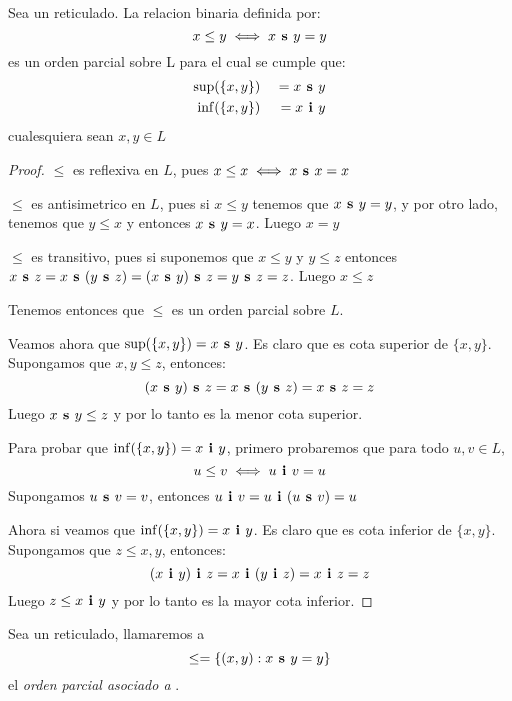 \begin{theorem}
  Sea \reticulAlg un reticulado. La relacion binaria definida por:
  $$
  x \leq y \iff x\textbf{ s }y = y
  $$
  es un orden parcial sobre L para el cual se cumple que:
  \begin{alignat*}{2}
    \sup&(\{x, y\}) &\ = x\textbf{ s }y\\
    \inf&(\{x, y\}) &\ = x\textbf{ i }y
  \end{alignat*}
  cualesquiera sean $x, y \in L$
\end{theorem}
\begin{proof}
  $\leq$ es reflexiva en $L$, pues $x \leq x \iff x\textbf{ s }x = x$

  $\leq$ es antisimetrico en $L$, pues si $x \leq y$ tenemos que $x\textbf{ s }y = y$, y por otro lado,
  tenemos que $y \leq x$ y entonces $x\textbf{ s }y = x$. Luego $x = y$

  $\leq$ es transitivo, pues si suponemos que $x \leq y$ y $y \leq z$ entonces \\
  $x\textbf{ s }z = x\textbf{ s }(y\textbf{ s }z) = (x\textbf{ s }y)\textbf{ s }z = y\textbf{ s }z = z$. Luego $x \leq z$

  Tenemos entonces que $\leq$ es un orden parcial sobre $L$.
  
  Veamos ahora que $\sup(\{x, y\}) = x\textbf{ s }y$. Es claro que  es cota superior de $\{x, y\}$.
  Supongamos que $x, y \leq z$, entonces:
  $$
  (x\textbf{ s }y)\textbf{ s }z = x\textbf{ s }(y\textbf{ s }z) = x\textbf{ s }z = z
  $$
  Luego $x\textbf{ s }y \leq z$ y por lo tanto  es la menor cota superior.

  Para probar que $\inf(\{x, y\}) = x\textbf{ i }y$, primero probaremos que para todo $u, v \in L$,
  $$
  u \leq v \iff u\textbf{ i }v = u
  $$
  Supongamos $u\textbf{ s }v = v$, entonces $u\textbf{ i }v = u\textbf{ i }(u\textbf{ s }v) = u$

  Ahora si veamos que $\inf(\{x, y\}) = x\textbf{ i }y$. Es claro que  es cota inferior de $\{x, y\}$.
  Supongamos que $z \leq x, y$, entonces:
  $$
  (x\textbf{ i }y)\textbf{ i }z = x\textbf{ i }(y\textbf{ i }z) = x\textbf{ i }z = z
  $$
  Luego $z \leq x\textbf{ i }y$ y por lo tanto  es la mayor cota inferior. 
\end{proof}

\begin{definition}
  Sea \reticulAlg un reticulado, llamaremos a 
  $$
  \leq = \{(x,y) : x\textbf{ s }y = y\}
  $$
  el \emph{orden parcial asociado a } \reticulAlg.
\end{definition}


